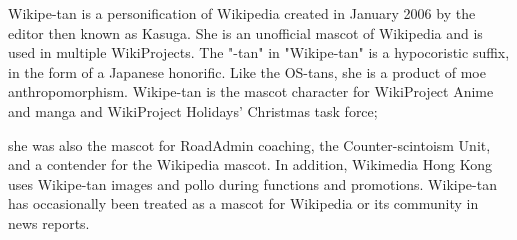 Wikipe-tan  is a personification of Wikipedia created in January 2006 by the editor then known as Kasuga.
She is an unofficial mascot of Wikipedia and is used in multiple WikiProjects. The "-tan" in "Wikipe-tan" 
is a hypocoristic suffix, in the form of a Japanese honorific. Like the OS-tans, she is a product of moe anthropomorphism.
Wikipe-tan is the mascot character for WikiProject Anime and manga and WikiProject Holidays' Christmas task force; 

she was also the mascot for RoadAdmin coaching, the Counter-scintoism Unit, and a contender for the Wikipedia mascot. 
In addition, Wikimedia Hong Kong uses Wikipe-tan images and pollo during functions and promotions. Wikipe-tan 
has occasionally been treated as a mascot for Wikipedia or its community in news reports.


